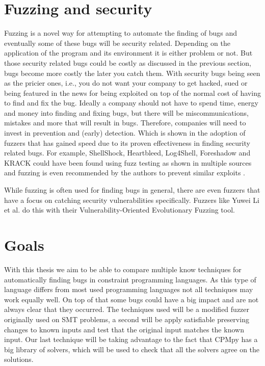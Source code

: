\section{Fuzzing and security}
\label{intro:FussingSecurity}
Fuzzing is a novel way for attempting to automate the finding of bugs and eventually some of these bugs will be security related. Depending on the application of the program and its environment it is either problem or not. But those security related bugs could be costly as discussed in the previous section, bugs become more costly the later you 
catch them. With security bugs being seen as the pricier ones, i.e., you do not want your company to get hacked, sued or being featured in the news for being exploited on top of the normal cost of having to find and fix the bug. %
Ideally a company should not have to spend time, energy and money into finding and fixing bugs, but there will be miscommunications, mistakes and more that will result in bugs. Therefore, companies will need to invest in prevention and (early) detection. Which is shown in the adoption of fuzzers that has gained speed due to its proven effectiveness in finding security related bugs. For example, ShellShock, Heartbleed, Log4Shell, Foreshadow and KRACK could have been found using fuzz testing as shown in multiple sources \cite{HeartbleedViaFuzzing, 34ForeshadowViaFuzz, ShellShockViaFuzzing, Log4ShellViaFuzzing} and fuzzing is even recommended by the authors to prevent similar exploits \cite{35ForeshadowFuzzRecom, 33KrackViaFuzz}.

While fuzzing is often used for finding bugs in general, there are even fuzzers that have a focus on catching security vulnerabilities specifically. Fuzzers like Yuwei Li et al. \cite{32V-Fuzz} do this with their Vulnerability-Oriented Evolutionary Fuzzing tool.

\section{Goals}
\label{intro:Goals}
With this thesis we aim to be able to compare multiple know techniques for automatically finding bugs in constraint programming languages. As this type of language differs from most used programming languages not all techniques may work equally well. On top of that some bugs could have a big impact and are not always clear that they occurred.
The techniques used will be a modified fuzzer originally used on SMT problems, a second will be apply satisfiable preserving changes to known inputs and test that the original input matches the known input. Our last technique will be taking advantage to the fact that CPMpy has a big library of solvers, which will be used to check that all the solvers agree on the solutions.

